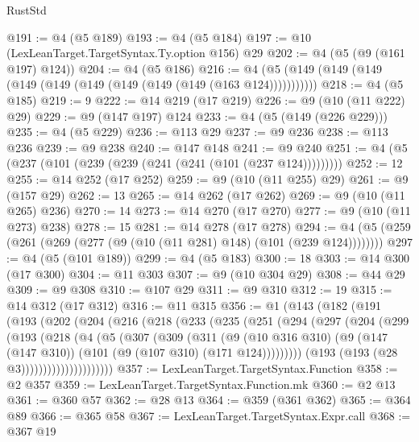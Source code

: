 \begin{lexlean}{RustStd}
\begin{coremodule}
{\begin{coremodule}
{{{{{{{{{{{{{{{{@191 := @4 (@5 @189)
@193 := @4 (@5 @184)
@197 := @10 (LexLeanTarget.TargetSyntax.Ty.option @156) @29
@202 := @4 (@5 (@9 (@161 @197) @124))
@204 := @4 (@5 @186)
@216 := @4 (@5 (@149 (@149 (@149 (@149 (@149 (@149 (@149 (@149 (@149 (@163 @124)))))))))))
@218 := @4 (@5 @185)
@219 := 9
@222 := @14 @219 (@17 @219)
@226 := @9 (@10 (@11 @222) @29)
@229 := @9 (@147 @197) @124
@233 := @4 (@5 (@149 (@226 @229)))
@235 := @4 (@5 @229)
@236 := @113 @29
@237 := @9 @236
@238 := @113 @236
@239 := @9 @238
@240 := @147 @148
@241 := @9 @240
@251 := @4 (@5 (@237 (@101 (@239 (@239 (@241 (@241 (@101 (@237 @124)))))))))
@252 := 12
@255 := @14 @252 (@17 @252)
@259 := @9 (@10 (@11 @255) @29)
@261 := @9 (@157 @29)
@262 := 13
@265 := @14 @262 (@17 @262)
@269 := @9 (@10 (@11 @265) @236)
@270 := 14
@273 := @14 @270 (@17 @270)
@277 := @9 (@10 (@11 @273) @238)
@278 := 15
@281 := @14 @278 (@17 @278)
@294 := @4 (@5 (@259 (@261 (@269 (@277 (@9 (@10 (@11 @281) @148) (@101 (@239 @124))))))))
@297 := @4 (@5 (@101 @189))
@299 := @4 (@5 @183)
@300 := 18
@303 := @14 @300 (@17 @300)
@304 := @11 @303
@307 := @9 (@10 @304 @29)
@308 := @44 @29
@309 := @9 @308
@310 := @107 @29
@311 := @9 @310
@312 := 19
@315 := @14 @312 (@17 @312)
@316 := @11 @315
@356 := @1
    (@143
      (@182
        (@191
          (@193
            (@202
              (@204
                (@216
                  (@218
                    (@233
                      (@235
                        (@251
                          (@294
                            (@297
                              (@204
                                (@299
                                  (@193
                                    (@218
                                      (@4
                                        (@5
                                          (@307
                                            (@309
                                              (@311
                                                (@9
                                                  (@10 @316 @310)
                                                  (@9
                                                    (@147 (@147 @310))
                                                    (@101 (@9 (@107 @310) (@171 @124)))))))))
                                        (@193 (@193 (@28 @3)))))))))))))))))))))
@357 := LexLeanTarget.TargetSyntax.Function
@358 := @2 @357
@359 := LexLeanTarget.TargetSyntax.Function.mk
@360 := @2 @13
@361 := @360 @57
@362 := @28 @13
@364 := @359 (@361 @362)
@365 := @364 @89
@366 := @365 @58
@367 := LexLeanTarget.TargetSyntax.Expr.call
@368 := @367 @19
}}}}}}}}}}}}}}}}
\end{coremodule}}
\end{coremodule}
\end{lexlean}

